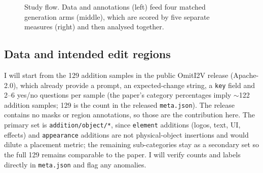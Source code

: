 \documentclass[10pt,a4paper]{article}
\begin{document}
\begin{figure}[t]
{}
\caption{Study flow. Data and annotations (left) feed four matched generation arms (middle), which are scored by five separate measures (right) and then analysed together.}
\label{fig:flow}
\end{figure}

\subsection{Data and intended edit regions}

I will start from the 129 addition samples in the public OmitI2V release (Apache-2.0), which already provide a prompt, an expected-change string, a \texttt{key} field and 2--6 yes/no questions per sample (the paper's category percentages imply $\sim$122 addition samples; 129 is the count in the released \texttt{meta.json}). The release contains no masks or region annotations, so those are the contribution here. The primary set is \texttt{addition/object/*}, since \texttt{element} additions (logos, text, UI, effects) and \texttt{appearance} additions are not physical-object insertions and would dilute a placement metric; the remaining sub-categories stay as a secondary set so the full 129 remains comparable to the paper. I will verify counts and labels directly in \texttt{meta.json} and flag any anomalies.
\end{document}

